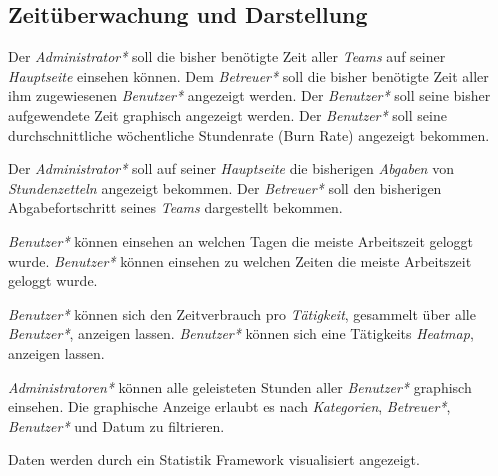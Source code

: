 \subsection{Zeitüberwachung und Darstellung}
    \begin{requirements}
        \begin{requirements}
             Der \emph{Administrator*} soll die bisher benötigte Zeit aller \emph{Teams} auf seiner \emph{Hauptseite} einsehen können.
             Dem \emph{Betreuer*} soll die bisher benötigte Zeit aller ihm zugewiesenen \emph{Benutzer*} angezeigt werden.
             Der \emph{Benutzer*} soll seine bisher aufgewendete Zeit graphisch angezeigt werden.
             Der \emph{Benutzer*} soll seine durchschnittliche wöchentliche Stundenrate (Burn Rate) angezeigt bekommen.
        \end{requirements}

        \begin{requirements}
             Der \emph{Administrator*} soll auf seiner \emph{Hauptseite} die bisherigen \emph{Abgaben} von \emph{Stundenzetteln} angezeigt bekommen.
             Der \emph{Betreuer*} soll den bisherigen Abgabefortschritt seines \emph{Teams} dargestellt bekommen.
        \end{requirements}

        \begin{requirements}
             \emph{Benutzer*} können einsehen an welchen Tagen die meiste Arbeitszeit geloggt wurde.
             \emph{Benutzer*} können einsehen zu welchen Zeiten die meiste Arbeitszeit geloggt wurde.
        \end{requirements}

        \begin{requirements}
             \emph{Benutzer*} können sich den Zeitverbrauch pro \emph{Tätigkeit}, gesammelt über alle \emph{Benutzer*}, anzeigen lassen.
             \emph{Benutzer*} können sich eine Tätigkeits \emph{Heatmap}, anzeigen lassen.
        \end{requirements}
        
        \begin{requirements}
              \emph{Administratoren*} können alle geleisteten Stunden aller \emph{Benutzer*} graphisch einsehen.
              Die graphische Anzeige erlaubt es nach \emph{Kategorien}, \emph{Betreuer*}, \emph{Benutzer*} und Datum zu filtrieren.
        \end{requirements}

        Daten werden durch ein Statistik Framework visualisiert angezeigt.
    \end{requirements}

